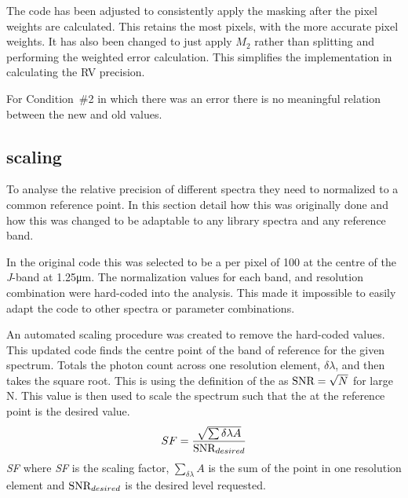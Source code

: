 The code has been adjusted to consistently apply the masking after the pixel weights are calculated.
This retains the most pixels, with the more accurate pixel weights.
It has also been changed to just apply \(M_2\) rather than splitting and performing the weighted error calculation.
 This simplifies the implementation in calculating the {RV} precision.



{\red{} For Condition~\#2 in which there was an error there is no meaningful relation between the new and old values.
    }


\subsection{\snr{} scaling}
\label{subsec:snr_scaling}
To analyse the relative precision of different spectra they need to normalized to a common reference point.
In this section  detail how this was originally done and how this was changed to be adaptable to any library spectra and any reference band.

In the original code this was selected to be a \snr{} per pixel of 100 at the centre of the \textit{J}-band at 1.25\si{\micro\meter}.
The normalization values for each band, \Vsini{} and resolution combination were hard-coded into the analysis.
This made it impossible to easily adapt the code to other spectra or parameter combinations.

An automated \snr{} scaling procedure was created to remove the hard-coded values.
This updated code finds the centre point of the band of reference for the given spectrum.
Totals the photon count across one resolution element, \(\delta\lambda\), and then takes the square root.
This is using the definition of the \snr{} as \(\textrm{SNR}{} = \sqrt{N}\) for large N.
This value is then used to scale the spectrum such that the \snr{} at the reference point is the desired value.
\begin{equation}
SF =  \frac{\sqrt{\sum{\delta\lambda} A}} {\textrm{SNR}{}_{desired}}
\end{equation}
\textit{SF} where \textit{SF} is the scaling factor, \(\sum_{\delta\lambda} A\) is the sum of the point in one resolution element and \({\textrm{SNR}{}}_{desired}\) is the desired \snr{} level requested.

